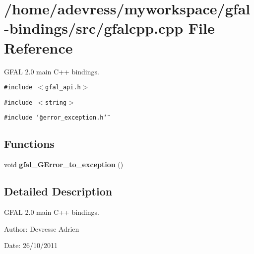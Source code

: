 \section{/home/adevress/myworkspace/gfal-bindings/src/gfalcpp.cpp File Reference}
\label{gfalcpp_8cpp}
GFAL 2.0 main C++ bindings. 

{\tt \#include $<$gfal\_\-api.h$>$}\par
{\tt \#include $<$string$>$}\par
{\tt \#include \char`\"{}gerror\_\-exception.h\char`\"{}}\par
\subsection*{Functions}
\begin{CompactItemize}
\item 
void \textbf{gfal\_\-GError\_\-to\_\-exception} ()\label{gfalcpp_8cpp_9b3fca5603debca7dd89ad78fe9b86fa}

\end{CompactItemize}


\subsection{Detailed Description}
GFAL 2.0 main C++ bindings. 

\begin{Desc}
\item[Author:]Devresse Adrien \end{Desc}
\begin{Desc}
\item[Date:]26/10/2011 \end{Desc}
